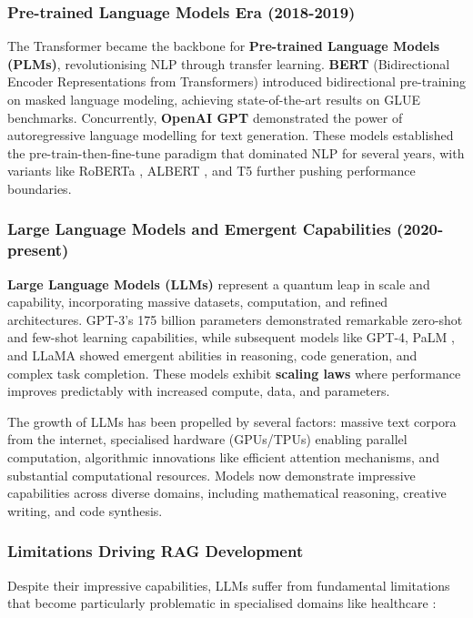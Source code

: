 \subsubsection{Pre-trained Language Models Era (2018-2019)}
The Transformer became the backbone for \textbf{Pre-trained Language Models (PLMs)}, revolutionising NLP through transfer learning. \textbf{BERT} (Bidirectional Encoder Representations from Transformers) \citep{devlin2019bert} introduced bidirectional pre-training on masked language modeling, achieving state-of-the-art results on GLUE benchmarks. Concurrently, \textbf{OpenAI GPT} \citep{radford2019language} demonstrated the power of autoregressive language modelling for text generation. These models established the pre-train-then-fine-tune paradigm that dominated NLP for several years, with variants like RoBERTa \citep{liu2019roberta}, ALBERT \citep{lan2020albert}, and T5 \citep{raffel2020t5} further pushing performance boundaries.

\subsubsection{Large Language Models and Emergent Capabilities (2020-present)}
\textbf{Large Language Models (LLMs)} represent a quantum leap in scale and capability, incorporating massive datasets, computation, and refined architectures. GPT-3's 175 billion parameters \citep{brown2020language} demonstrated remarkable zero-shot and few-shot learning capabilities, while subsequent models like GPT-4, PaLM \citep{chowdhery2022palm}, and LLaMA \citep{touvron2023llama} showed emergent abilities in reasoning, code generation, and complex task completion. These models exhibit \textbf{scaling laws} \citep{kaplan2020scaling} where performance improves predictably with increased compute, data, and parameters.

The growth of LLMs has been propelled by several factors: massive text corpora from the internet, specialised hardware (GPUs/TPUs) enabling parallel computation, algorithmic innovations like efficient attention mechanisms, and substantial computational resources. Models now demonstrate impressive capabilities across diverse domains, including mathematical reasoning, creative writing, and code synthesis.

\subsubsection{Limitations Driving RAG Development}
Despite their impressive capabilities, LLMs suffer from fundamental limitations that become particularly problematic in specialised domains like healthcare \citep{ji2023survey}:


